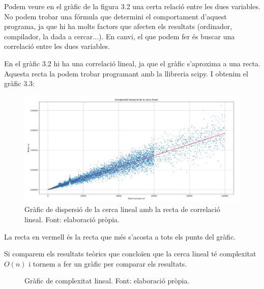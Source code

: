 Podem veure en el gràfic de la figura 3.2 una certa relació entre les dues variables. No podem trobar una fórmula que determini el comportament d'aquest programa, ja que hi ha molts factors que afecten els resultats (ordinador, compilador, la dada a cercar...). En canvi, el que podem fer és buscar una correlació entre les dues variables.

En el gràfic 3.2 hi ha una correlació lineal, ja que el gràfic s'aproxima a una recta. Aquesta recta la podem trobar programant amb la llibreria scipy. I obtenim el gràfic 3.3:
\begin{figure}[H]
    \centering
    \includegraphics[width=1\textwidth]{capitols/figures/linearplot2.png}
    \caption[Gràfic de dispersió de la cerca lineal amb la recta de correlació lineal.]{Gràfic de dispersió de la cerca lineal amb la recta de correlació lineal. Font: elaboració pròpia.}
    \label{fig:my_label}
\end{figure}

La recta en vermell és la recta que més s'acosta a tots els punts del gràfic.

Si comparem els resultats teòrics que concloïen que la cerca lineal té complexitat $O(n)$ i tornem a fer un gràfic per comparar els resultats.
\begin{figure}[H]
\centering
{}
    \caption[Gràfic de complexitat lineal.]{Gràfic de complexitat lineal. Font: elaboració pròpia.}
    \label{fig:my_label}
\end{figure}

